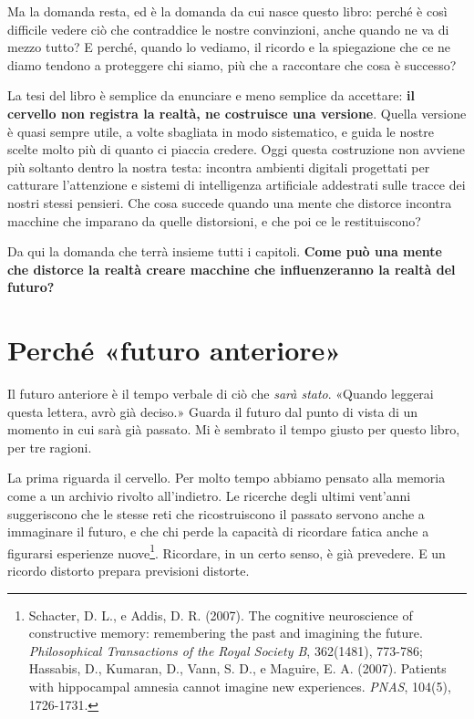 Ma la domanda resta, ed è la domanda da cui nasce questo libro: perché è così difficile vedere ciò che contraddice le nostre convinzioni, anche quando ne va di mezzo tutto? E perché, quando lo vediamo, il ricordo e la spiegazione che ce ne diamo tendono a proteggere chi siamo, più che a raccontare che cosa è successo?

\vspace{1em}

La tesi del libro è semplice da enunciare e meno semplice da accettare: \textbf{il cervello non registra la realtà, ne costruisce una versione}. Quella versione è quasi sempre utile, a volte sbagliata in modo sistematico, e guida le nostre scelte molto più di quanto ci piaccia credere. Oggi questa costruzione non avviene più soltanto dentro la nostra testa: incontra ambienti digitali progettati per catturare l'attenzione e sistemi di intelligenza artificiale addestrati sulle tracce dei nostri stessi pensieri. Che cosa succede quando una mente che distorce incontra macchine che imparano da quelle distorsioni, e che poi ce le restituiscono?

Da qui la domanda che terrà insieme tutti i capitoli. \textbf{Come può una mente che distorce la realtà creare macchine che influenzeranno la realtà del futuro?}

\section*{Perché «futuro anteriore»}

Il futuro anteriore è il tempo verbale di ciò che \textit{sarà stato}. «Quando leggerai questa lettera, avrò già deciso.» Guarda il futuro dal punto di vista di un momento in cui sarà già passato. Mi è sembrato il tempo giusto per questo libro, per tre ragioni.

La prima riguarda il cervello. Per molto tempo abbiamo pensato alla memoria come a un archivio rivolto all'indietro. Le ricerche degli ultimi vent'anni suggeriscono che le stesse reti che ricostruiscono il passato servono anche a immaginare il futuro, e che chi perde la capacità di ricordare fatica anche a figurarsi esperienze nuove\footnote{Schacter, D. L., e Addis, D. R. (2007). The cognitive neuroscience of constructive memory: remembering the past and imagining the future. \textit{Philosophical Transactions of the Royal Society B}, 362(1481), 773-786; Hassabis, D., Kumaran, D., Vann, S. D., e Maguire, E. A. (2007). Patients with hippocampal amnesia cannot imagine new experiences. \textit{PNAS}, 104(5), 1726-1731.}. Ricordare, in un certo senso, è già prevedere. E un ricordo distorto prepara previsioni distorte.

